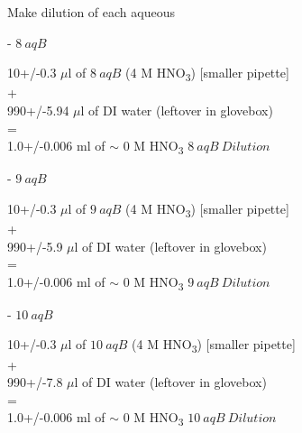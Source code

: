 \documentclass[idxtotoc,hyperref,openany,oneside]{labbook} %
\newcommand{\cmark}{\ding{51}}%
\newcommand{\done}{\rlap{$\square$}{\raisebox{2pt}{\large\hspace{1pt}\cmark}}%
  \hspace{-2.5pt}}
\newcommand{\tsbs}{\textsubscript}
\begin{document}
\begin{todolist}
\item[\done]{Make dilution of each aqueous}
  \begin{todolist}
  \item[\done]{- $\boxed{8\ aqB}$}
  \end{todolist}
  \begin{center}
    10+/-0.3 $\mu$l of $\boxed{8\ aqB}$
    (4 M HNO\tsbs{3}) [smaller pipette]\\
    +\\
    990+/-5.94 $\mu$l of DI water (leftover in glovebox)\\
    =\\
    1.0+/-0.006 ml of $\sim$
    0 M HNO\tsbs{3} $\boxed{8\ aqB\ Dilution}$
  \end{center}
  \begin{todolist}
  \item[\done]{- $\boxed{9\ aqB}$}
  \end{todolist}
  \begin{center}
    10+/-0.3 $\mu$l of $\boxed{9\ aqB}$
    (4 M HNO\tsbs{3}) [smaller pipette]\\
    +\\
    990+/-5.9 $\mu$l of DI water (leftover in glovebox)\\
    =\\
    1.0+/-0.006 ml of $\sim$
    0 M HNO\tsbs{3} $\boxed{9\ aqB\ Dilution}$
  \end{center}
  \begin{todolist}
  \item[\done]{- $\boxed{10\ aqB}$}
  \end{todolist}
  \begin{center}
    10+/-0.3 $\mu$l of $\boxed{10\ aqB}$
    (4 M HNO\tsbs{3}) [smaller pipette]\\
    +\\
    990+/-7.8 $\mu$l of DI water (leftover in glovebox)\\
    =\\
    1.0+/-0.006 ml of $\sim$
    0 M HNO\tsbs{3} $\boxed{10\ aqB\ Dilution}$
  \end{center}


\end{todolist}
\end{document}
